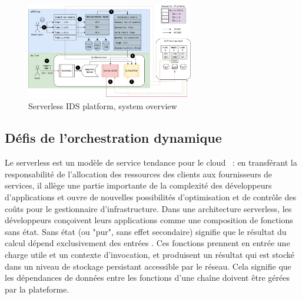 \begin{figure}[t]
\centering
\includegraphics[width=0.65\textwidth]{6_Chapitre4/figures/serverless-platform-storage.png}
\caption{Serverless IDS platform, system overview}
\label{figure:herocache-serverless-platform}
\end{figure}

\subsection{Défis de l'orchestration dynamique}

Le serverless est un modèle de service tendance pour le cloud~\cite{Lannurien2023} : en transférant la responsabilité de l'allocation des ressources des clients aux fournisseurs de services, il allège une partie importante de la complexité des développeurs d'applications et ouvre de nouvelles possibilités d'optimisation et de contrôle des coûts pour le gestionnaire d'infrastructure.
Dans une architecture serverless, les développeurs conçoivent leurs applications comme une composition de fonctions sans état. Sans état (ou "pur", sans effet secondaire) signifie que le résultat du calcul dépend exclusivement des entrées \cite{burckhardtNetheriteEfficientExecution}. Ces fonctions prennent en entrée une charge utile et un contexte d'invocation, et produisent un résultat qui est stocké dans un niveau de stockage persistant accessible par le réseau. Cela signifie que les dépendances de données entre les fonctions d'une chaîne doivent être gérées par la plateforme.

